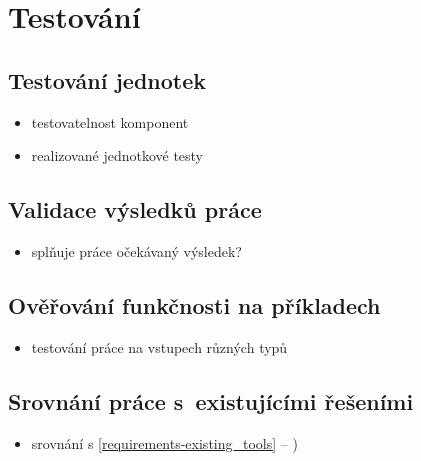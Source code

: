 \chapter{Testování}


\section{Testování jednotek}
\begin{itemize}
\item testovatelnost komponent
\item realizované jednotkové testy
\end{itemize}

\section{Validace výsledků práce}
\begin{itemize}
\item splňuje práce očekávaný výsledek?
\end{itemize}

\section{Ověřování funkčnosti na příkladech}
\begin{itemize}
\item testování práce na vstupech různých typů
\end{itemize}

\section{Srovnání práce s~existujícími řešeními}
\begin{itemize}
\item srovnání s \ref{requirements-existing_tools} -- )
\end{itemize}
